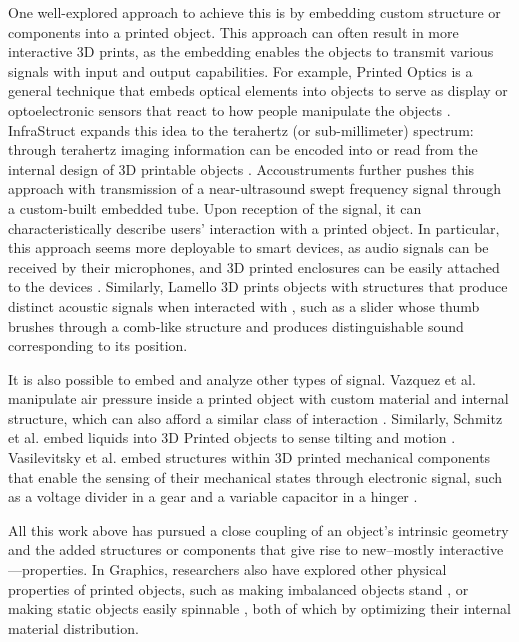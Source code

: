 One well-explored approach to achieve this is by embedding custom structure or components into a printed object. This approach can often result in more interactive 3D prints, as the embedding enables the objects to transmit various signals with input and output capabilities. For example, Printed Optics is a general technique that embeds optical elements into objects to serve as display or optoelectronic sensors that react to how people manipulate the objects \cite{willis2012printed, brockmeyer2013papillon}. InfraStruct expands this idea to the terahertz (or sub-millimeter) spectrum: through terahertz imaging information can be encoded into or read from the internal design of 3D printable objects \cite{willis2013infrastructs}. Accoustruments further pushes this approach with transmission of a near-ultrasound swept frequency signal through a custom-built embedded tube. Upon reception of the signal, it can characteristically describe users' interaction with a printed object. In particular, this approach seems more deployable to smart devices, as audio signals can be received by their microphones, and 3D printed enclosures can be easily attached to the devices \cite{laput2015acoustruments}. Similarly, Lamello 3D prints objects with structures that produce distinct acoustic signals when interacted with \cite{savage2015lamello}, such as a slider whose thumb brushes through a comb-like structure and produces distinguishable sound corresponding to its position.

It is also possible to embed and analyze other types of signal. Vazquez et al. manipulate air pressure inside a printed object with custom material and internal structure, which can also afford a similar class of interaction \cite{vazquez20153d}. Similarly, Schmitz et al. embed liquids into 3D Printed objects to sense tilting and motion \cite{schmitz2016liquido}. Vasilevitsky et al. embed structures within 3D printed mechanical components that enable the sensing of their mechanical states through electronic signal, such as a voltage divider in a gear and a variable capacitor in a hinger \cite{vasilevitsky2016steel}.

All this work above has pursued a close coupling of an object's intrinsic geometry and the added structures or components that give rise to new--mostly interactive---properties. In Graphics, researchers also have explored other physical properties of printed objects, such as making imbalanced objects stand \cite{prevost2013make}, or making static objects easily spinnable \cite{bacher2014spin}, both of which by optimizing their internal material distribution.

